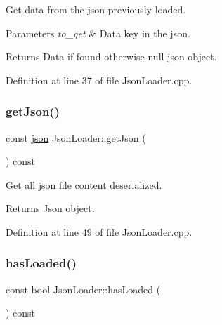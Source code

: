 Get data from the json previously loaded. 


\begin{DoxyParams}{Parameters}
{\em to\+\_\+get} & Data key in the json.\\
\hline
\end{DoxyParams}
\begin{DoxyReturn}{Returns}
Data if found otherwise null json object. 
\end{DoxyReturn}


Definition at line 37 of file Json\+Loader.\+cpp.

\mbox{\label{classtls_1_1_json_loader_aef4c88eb0589673f806e7fedf7b3b6b9}} 
\subsubsection{\texorpdfstring{get\+Json()}{getJson()}}
{\footnotesize\ttfamily const \hyperlink{namespacetls_a4e8d32383e204ee25990db65651ea712}{json} Json\+Loader\+::get\+Json (\begin{DoxyParamCaption}{ }\end{DoxyParamCaption}) const\hspace{0.3cm}{\ttfamily [noexcept]}}



Get all json file content deserialized. 

\begin{DoxyReturn}{Returns}
Json object. 
\end{DoxyReturn}


Definition at line 49 of file Json\+Loader.\+cpp.

\mbox{\label{classtls_1_1_json_loader_ac7fa5168de0714b4ab4cf3f7f366dbdf}} 
\subsubsection{\texorpdfstring{has\+Loaded()}{hasLoaded()}}
{\footnotesize\ttfamily const bool Json\+Loader\+::has\+Loaded (\begin{DoxyParamCaption}{ }\end{DoxyParamCaption}) const\hspace{0.3cm}{\ttfamily [noexcept]}}




